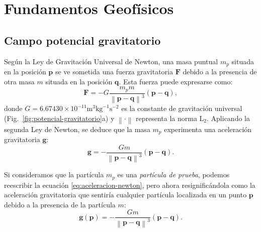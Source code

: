 \chapter{Fundamentos Geofísicos}
\label{cha:fundamentos}

\section{Campo potencial gravitatorio}

Según la Ley de Gravitación Universal de Newton, una masa puntual $m_p$ situada
en la posición $\mathbf{p}$ se ve sometida una fuerza gravitatoria $\mathbf{F}$
debido a la presencia de otra masa $m$ situada en la posición $\mathbf{q}$.
Esta fuerza puede expresarse como:
%
\begin{equation}
    \mathbf{F} =
        - G
        \frac{m_p m}{\left\lVert \mathbf{p} - \mathbf{q}\right\rVert^3}
        (\mathbf{p} - \mathbf{q}),
\end{equation}
%
donde $G = 6.67430 \times 10^{-11} \text{m}^3 \text{kg}^{-1}
\text{s}^{-2}$ es la constante de gravitación universal
(Fig.~\ref{fig:potencial-gravitatorio}a) y $\left\lVert \cdot \right\rVert$
representa la norma L$_2$.
Aplicando la segunda Ley de Newton, se deduce que la masa $m_p$ experimenta una
aceleración gravitatoria $\mathbf{g}$:
%
\begin{equation}
    \mathbf{g} =
        - \frac{G m}{\left\lVert \mathbf{p} - \mathbf{q} \right\rVert^3}
        (\mathbf{p} - \mathbf{q}).
    \label{eq:aceleracion-newton}
\end{equation}

Si consideramos que la partícula $m_p$ es una \emph{partícula de prueba},
podemos reescribir la ecuación \ref{eq:aceleracion-newton}, pero ahora
resignificándola como la aceleración gravitatoria que sentiría cualquier
partícula localizada en un punto $\mathbf{p}$ debido a la presencia de la
partícula $m$:
%
\begin{equation}
    \mathbf{g}(\mathbf{p}) =
        - \frac{G m}{\left\lVert \mathbf{p} - \mathbf{q} \right\rVert^3}
        (\mathbf{p} - \mathbf{q}).
\end{equation}

